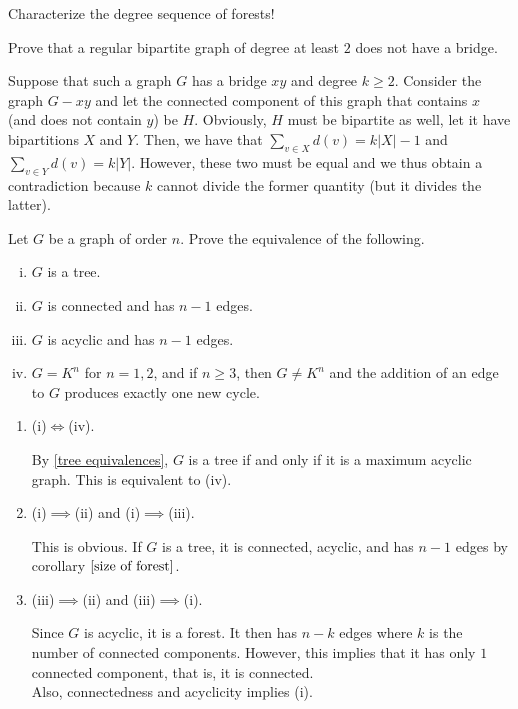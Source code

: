 \begin{exercise}
Characterize the degree sequence of forests!
\end{exercise}
\begin{solution}
 
\end{solution}

\begin{exercise}
Prove that a regular bipartite graph of degree at least $2$ does not have a bridge.
\end{exercise}
\begin{solution}
Suppose that such a graph $G$ has a bridge $xy$ and degree $k\geq 2$. Consider the graph $G-xy$ and let the connected component of this graph that contains $x$ (and does not contain $y$) be $H$. Obviously, $H$ must be bipartite as well, let it have bipartitions $X$ and $Y$. Then, we have that $\sum_{v\in X}d(v) = k|X|-1$ and $\sum_{v\in Y}d(v)=k|Y|$. However, these two must be equal and we thus obtain a contradiction because $k$ cannot divide the former quantity (but it divides the latter).
\end{solution}

\begin{exercise}
Let $G$ be a graph of order $n$. Prove the equivalence of the following.
\begin{enumerate}[(i)]
    \item $G$ is a tree.
    \item $G$ is connected and has $n-1$ edges.
    \item $G$ is acyclic and has $n-1$ edges.
    \item $G=K^n$ for $n=1,2$, and if $n\geq 3$, then $G\neq K^n$ and the addition of an edge to $G$ produces exactly one new cycle.
\end{enumerate}
\end{exercise}
\begin{solution}
\begin{enumerate}[]
    \item (i)$\iff$(iv).
    
    By \cref{tree equivalences}, $G$ is a tree if and only if it is a maximum acyclic graph. This is equivalent to (iv).
    
    
    \item (i)$\implies$(ii) and (i)$\implies$(iii).
    
    This is obvious. If $G$ is a tree, it is connected, acyclic, and has $n-1$ edges by corollary $\ref{size of forest}$.
    
    \item (iii)$\implies$(ii) and (iii)$\implies$(i).
    
    Since $G$ is acyclic, it is a forest. It then has $n-k$ edges where $k$ is the number of connected components. However, this implies that it has only $1$ connected component, that is, it is connected.\\
    Also, connectedness and acyclicity implies (i).
\end{enumerate}
\end{solution}

